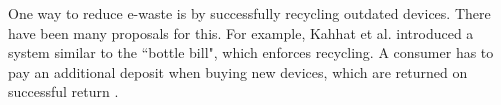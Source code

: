 One way to reduce e-waste is by successfully recycling outdated devices. There have been many proposals for this.
For example, Kahhat et al. introduced a system similar to the ``bottle bill", which enforces recycling. A consumer has to pay
an additional deposit when buying new devices, which are returned on successful return \cite{kahhat2008exploring}.